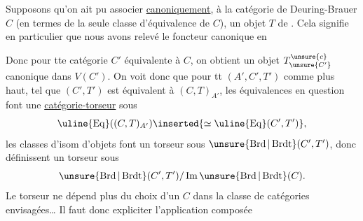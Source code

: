 
Supposons qu'on ait pu associer \uline{canoniquement}, à la catégorie de Deuring-Brauer $C$ (en termes de la seule classe d'équivalence de $C$), un objet $T$ de . Cela signifie en particulier que nous avons relevé le foncteur canonique 
en

Donc pour tte catégorie $C'$ équivalente à $C$, on obtient un objet $T_{\unsure{C'}}^{\unsure{c}}$ canonique dans $V(C')$.
On voit donc que pour tt $(A',C',T')$ comme plus haut,  tel que $(C',T')$ est équivalent à $(C,T)_{A'}$, les équivalences en question font une \uline{catégorie-torseur} sous
\[
\uline{\mathrm{Eq}}((C,T)_{A'})
\inserted{\simeq\uline{\mathrm{Eq}}(C',T')},
\]
les classes d'isom d'objets font un torseur sous
$\unsure{\operatorname{Brd}|\operatorname{Brdt}}(C',T')$,
donc définissent un torseur sous
\[
\unsure{\operatorname{Brd}|\operatorname{Brdt}}(C',T')/
\operatorname{Im}\unsure{\operatorname{Brd}|\operatorname{Brdt}}(C).
\]
Le torseur ne dépend plus du choix d'un $C$ dans la classe de catégories envisagées\ldots
Il faut donc expliciter l'application composée
